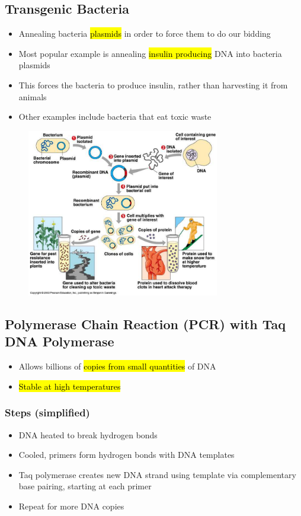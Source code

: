 \documentclass[a4paper,12pt]{article}
\begin{document}
\subsection{Transgenic Bacteria}
\begin{itemize}
    \item{Annealing bacteria \hl{plasmids} in order to force them to do our bidding}
    \item{Most popular example is annealing \hl{insulin producing} DNA into bacteria plasmids}
    \item{This forces the bacteria to produce insulin, rather than harvesting it from animals}
    \item{Other examples include bacteria that eat toxic waste}
\end{itemize}

\begin{figure}[H]
    \centering
    \includegraphics[width=0.75\textwidth]{plasmid}
\end{figure}

\subsection{Polymerase Chain Reaction (PCR) with Taq DNA Polymerase}
\begin{itemize}
    \item{Allows billions of \hl{copies from small quantities} of DNA}
    \item{\hl{Stable at high temperatures}}
\end{itemize}

\subsubsection{Steps (simplified)}
\begin{itemize}
    \item{DNA heated to break hydrogen bonds}
    \item{Cooled, primers form hydrogen bonds with DNA templates}
    \item{Taq polymerase creates new DNA strand using template via complementary base pairing, starting at each primer}
    \item{Repeat for more DNA copies}
\end{itemize}
\end{document}
